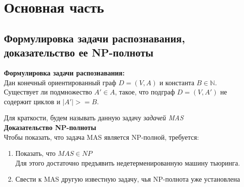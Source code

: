 
\section{Основная часть}
\subsection{Формулировка задачи распознавания, доказательство ее NP-полноты}

\textbf{Формулировка задачи распознавания:} \\

Дан конечный ориентированный граф $D = (V, A)$ и константа $B \in \mathbb{N}$.
Существует ли подмножество $A' \in A$, такое, что подграф $D = (V, A')$ не
содержит циклов и $|A'| >= B$. 

Для краткости, будем называть данную задачу \textit{задачей MAS} \\

\textbf{Доказательство NP-полноты} \\

Чтобы показать, что задача MAS является NP-полной, требуется:

\begin{enumerate}
    \setlength{\itemindent}{1em}
    \item Показать, что $MAS \in NP$ \\
        Для этого достаточно предъявить недетерменированную машину тьюринга.
    \item Свести к MAS другую известную задачу, чья NP-полнота уже установлена 
\end{enumerate}


